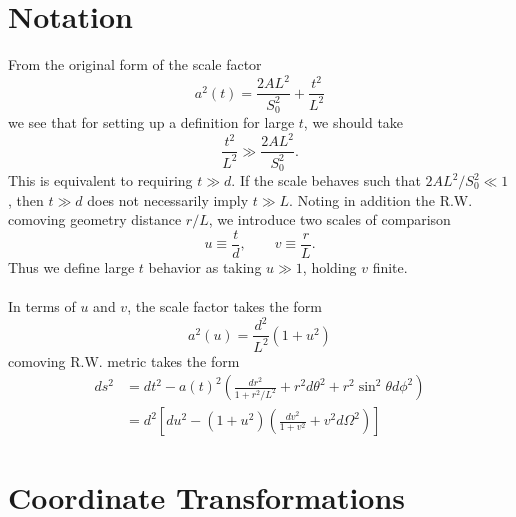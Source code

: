 \documentclass[10pt,letterpaper]{article}
\begin{document}
\section*{Notation}
From the original form of the scale factor
\begin{equation}
a^2(t) = \frac{2A L^2}{S_0^2} + \frac{t^2}{L^2} 
\end{equation}
we see that for setting up a definition for large $t$, we should take
\begin{equation}
\frac{t^2}{L^2} \gg \frac{2A L^2}{S_0^2}.
\end{equation}
This is equivalent to requiring $t\gg d$. If the scale behaves such that $2AL^2 /S_0^2 \ll 1$, then $t\gg d$ does not necessarily imply $t \gg L$. Noting in addition the R.W. comoving geometry distance $r/L$, we introduce two scales of comparison 
\begin{equation}
u \equiv \frac{t}{d},\qquad v \equiv \frac{r}{L}.
\end{equation}
Thus we define large $t$ behavior as taking $u\gg 1$, holding $v$ finite. \\ \\
In terms of $u$ and $v$, the scale factor takes the form
\begin{equation}
a^2(u) = \frac{d^2}{L^2}(1+u^2)
\end{equation}
comoving R.W. metric takes the form
\begin{align}
ds^2 &=  dt^2 - a(t)^2 \left(  \frac{dr^2}{1+r^2/L^2} + r^2 d\theta^2 + r^2\sin^2\theta d\phi^2 \right)\nonumber\\
&= d^2 \left[ du^2 - (1+u^2)\left( \frac{dv^2}{1+v^2} + v^2 d\Omega^2\right)\right] 
\end{align}
\section*{Coordinate Transformations}
\end{document}

